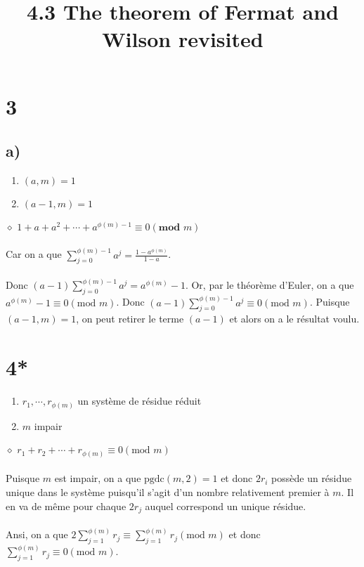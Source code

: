 \documentclass[a4paper,10pt]{article}
\title{4.3 The theorem of Fermat and Wilson revisited}
\begin{document}
\maketitle

\section*{3}
\subsection*{a)}
\begin{enumerate}
	\item $(a,m) = 1$
	\item $(a-1,m) = 1$
\end{enumerate}
$\diamond$ \textbf{$1 + a + a^2 + \cdots + a^{\phi(m) - 1} \equiv 0 (\textbf{mod } m)$}
\\
\\
Car on a que $\displaystyle\sum_{j=0}^{\phi(m)-1} a^j = \frac{1-a^{\phi(m)}}{1-a}$.
\\
\\
Donc $(a-1) \displaystyle\sum_{j=0}^{\phi(m)-1} a^j = a^{\phi(m)} - 1$. Or, par le théorème d'Euler, on a que $a^{\phi(m)}-1 \equiv 0 (\text{mod } m)$. Donc $(a-1)\displaystyle\sum_{j=0}^{\phi(m)-1} a^j \equiv 0 (\text{mod } m)$. Puisque $(a-1,m) = 1$, on peut retirer le terme $(a-1)$ et alors on a le résultat voulu.

\section*{4*}
\begin{enumerate}
	\item $r_1, \cdots, r_{\phi(m)}$ un système de résidue réduit
	\item $m$ impair
\end{enumerate}
$\diamond$ \textbf{$r_1 + r_2 + \cdots + r_{\phi(m)} \equiv 0 (\text{mod } m)$}
\\
\\
Puisque $m$ est impair, on a que $\text{pgdc}(m,2) = 1$ et donc $2r_i$ possède un résidue unique dans le système puisqu'il s'agit d'un nombre relativement premier à $m$. Il en va de même pour chaque $2r_j$ auquel correspond un unique résidue.
\\
\\
Ansi, on a que $2\displaystyle\sum_{j=1}^{\phi(m)}r_j \equiv \displaystyle\sum_{j=1}^{\phi(m)} r_j (\text{mod }m)$ et donc $\displaystyle\sum_{j=1}^{\phi(m)}r_j \equiv 0 (\text{mod }m)$.  
\end{document}
